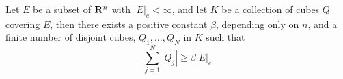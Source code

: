\begin{theorem}
Let $E$ be a subset of $\mathbf{R}^n$ with $|E|_e<\infty$, and let $K$ be a
collection of cubes $Q$ covering $E$, then there exists a positive constant
$\beta$, depending only on $n$, and a finite number of disjoint cubes,
$Q_1,\dotsc,Q_N$ in $K$ such that
\[
\sum_{j=1}^N|Q_j|\geq\beta|E|_e
\]
\end{theorem}

